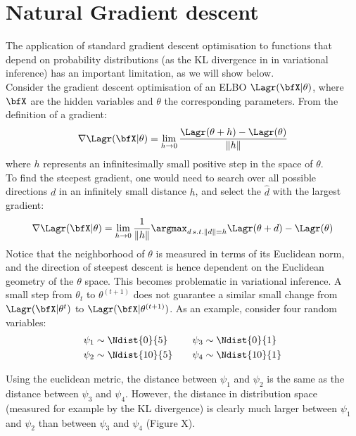 \graphicspath{{Chapter2/Figs/}}

\section{Natural Gradient descent}


The application of standard gradient descent optimisation to functions that depend on probability distributions (as the KL divergence in in variational inference) has an important limitation, as we will show below. \\

Consider the gradient descent optimisation of an ELBO $\Lagr(\bfX|\theta)$, where $\bfX$ are the hidden variables and $\theta$ the corresponding parameters. From the definition of a gradient:
\[
\nabla \Lagr(\bfX|\theta) = \lim_{h\to0} \frac{\Lagr(\theta + h) - \Lagr(\theta)}{\|h\|}
\]
where $h$ represents an infinitesimally small positive step in the space of $\theta$.\\

To find the steepest gradient, one would need to search over all possible directions $d$ in an infinitely small distance $h$, and select the $\hat{d}$ with the largest gradient:
\[
\nabla \Lagr(\bfX|\theta) = \lim_{h\to0} \frac{1}{\|h\|}\argmax_{d \, s.t. \|d\|=h} \Lagr(\theta+d) - \Lagr(\theta)
\]
Notice that the neighborhood of $\theta$ is measured in terms of its Euclidean norm, and the direction of steepest descent is hence dependent on the Euclidean geometry of the $\theta$ space. This becomes problematic in variational inference. A small step from $\theta_t$ to $\theta^{(t+1)}$ does not guarantee a similar small change from $\Lagr(\bfX|\theta^t)$ to $\Lagr(\bfX|\theta^{(t+1)})$. As an example, consider four random variables:
\begin{equation}
	\begin{split}
		\psi_1 &\sim \Ndist{0}{5} \\
		\psi_2 &\sim \Ndist{10}{5}
	\end{split}
	\qquad
	\begin{split}
		\psi_3 &\sim \Ndist{0}{1} \\
		\psi_4 &\sim \Ndist{10}{1}
	\end{split}
\end{equation}

Using the euclidean metric, the distance between $\psi_1$ and $\psi_2$ is the same as the distance between $\psi_3$ and $\psi_4$. However, the distance in distribution space (measured for example by the KL divergence) is clearly much larger between $\psi_1$ and $\psi_2$ than between $\psi_3$ and $\psi_4$ (Figure X).

